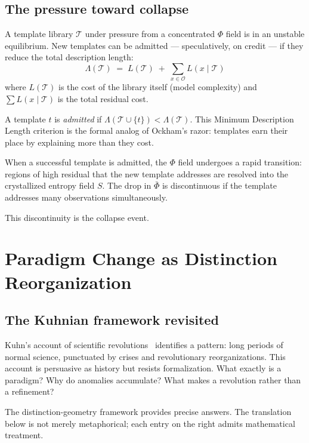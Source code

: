 \documentclass[11pt, a4paper]{article}
\theoremstyle{plain}
\theoremstyle{definition}
\theoremstyle{remark}
\newcommand{\Obs}{\mathcal{O}}
\newcommand{\PhiF}{\varPhi}
\newcommand{\Tlib}{\mathcal{T}}
\newcommand{\Lam}{\Lambda}
\begin{document}
\subsection{The pressure toward collapse}

A template library $\Tlib$ under pressure from a concentrated
$\PhiF$ field is in an unstable equilibrium. New templates can be
admitted --- speculatively, on credit --- if they reduce the total
description length:
\[
  \Lam(\Tlib) \;=\; L(\Tlib) \;+\; \sum_{x \in \Obs} L(x \mid \Tlib)
\]
where $L(\Tlib)$ is the cost of the library itself (model complexity)
and $\sum L(x \mid \Tlib)$ is the total residual cost.

A template $t$ is \emph{admitted} if $\Lam(\Tlib \cup \{t\}) < \Lam(\Tlib)$.
This Minimum Description Length criterion is the formal analog
of Ockham's razor: templates earn their place by explaining more
than they cost.

When a successful template is admitted, the $\PhiF$ field undergoes
a rapid transition: regions of high residual that the new template
addresses are resolved into the crystallized entropy field $S$.
The drop in $\bar\PhiF$ is discontinuous if the template addresses
many observations simultaneously.

This discontinuity is the collapse event.

\section{Paradigm Change as Distinction Reorganization}
\label{sec:kuhn}

\subsection{The Kuhnian framework revisited}

Kuhn's account of scientific revolutions~\cite{kuhn1962} identifies
a pattern: long periods of normal science, punctuated by crises
and revolutionary reorganizations. This account is persuasive as
history but resists formalization. What exactly is a paradigm?
Why do anomalies accumulate? What makes a revolution rather than
a refinement?

The distinction-geometry framework provides precise answers.
The translation below is not merely metaphorical; each entry on the
right admits mathematical treatment.
\end{document}

